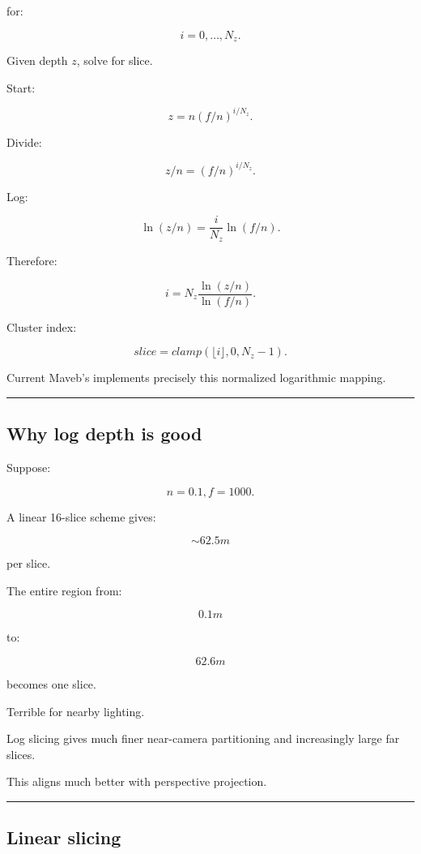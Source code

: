 for:

\[
i=0,\dots,N_z.
\]

Given depth \(z\), solve for slice.

Start:

\[
z=
n(f/n)^{i/N_z}.
\]

Divide:

\[
z/n=
(f/n)^{i/N_z}.
\]

Log:

\[
\ln(z/n)
=
\frac i{N_z}
\ln(f/n).
\]

Therefore:

\[
\boxed{
i
=
N_z
\frac{
\ln(z/n)
}{
\ln(f/n)
}.
}
\]

Cluster index:

\[
slice=
clamp(
\lfloor i\rfloor,
0,
N_z-1
).
\]

Current Maveb's  implements precisely this normalized logarithmic mapping.

\begin{center}\rule{0.5\linewidth}{0.5pt}\end{center}

\subsection{Why log depth is good}\label{04-visual-computing-ii-ch040-why-log-depth-is-good}

\hypertarget{04-visual-computing-ii-ch040-why-log-depth-is-good}{}

Suppose:

\[
n=0.1,
f=1000.
\]

A linear 16-slice scheme gives:

\[
\sim62.5m
\]

per slice.

The entire region from:

\[
0.1m
\]

to:

\[
62.6m
\]

becomes one slice.

Terrible for nearby lighting.

Log slicing gives much finer near-camera partitioning and increasingly large far slices.

This aligns much better with perspective projection.

\begin{center}\rule{0.5\linewidth}{0.5pt}\end{center}

\subsection{Linear slicing}\label{04-visual-computing-ii-ch040-linear-slicing}

